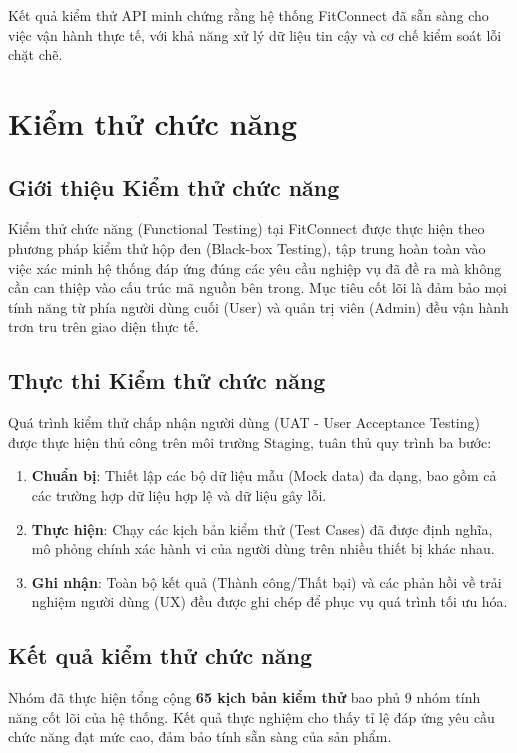 Kết quả kiểm thử API minh chứng rằng hệ thống FitConnect đã sẵn sàng cho việc vận hành thực tế, với khả năng xử lý dữ liệu tin cậy và cơ chế kiểm soát lỗi chặt chẽ.

\section{Kiểm thử chức năng}
\label{sec:test_functional}

\subsection{Giới thiệu Kiểm thử chức năng}
Kiểm thử chức năng (Functional Testing) tại FitConnect được thực hiện theo phương pháp kiểm thử hộp đen (Black-box Testing), tập trung hoàn toàn vào việc xác minh hệ thống đáp ứng đúng các yêu cầu nghiệp vụ đã đề ra mà không cần can thiệp vào cấu trúc mã nguồn bên trong. Mục tiêu cốt lõi là đảm bảo mọi tính năng từ phía người dùng cuối (User) và quản trị viên (Admin) đều vận hành trơn tru trên giao diện thực tế.

\subsection{Thực thi Kiểm thử chức năng}
Quá trình kiểm thử chấp nhận người dùng (UAT - User Acceptance Testing) được thực hiện thủ công trên môi trường Staging, tuân thủ quy trình ba bước:
\begin{enumerate}
    \item \textbf{Chuẩn bị}: Thiết lập các bộ dữ liệu mẫu (Mock data) đa dạng, bao gồm cả các trường hợp dữ liệu hợp lệ và dữ liệu gây lỗi.
    \item \textbf{Thực hiện}: Chạy các kịch bản kiểm thử (Test Cases) đã được định nghĩa, mô phỏng chính xác hành vi của người dùng trên nhiều thiết bị khác nhau.
    \item \textbf{Ghi nhận}: Toàn bộ kết quả (Thành công/Thất bại) và các phản hồi về trải nghiệm người dùng (UX) đều được ghi chép để phục vụ quá trình tối ưu hóa.
\end{enumerate}

\subsection{Kết quả kiểm thử chức năng}
Nhóm đã thực hiện tổng cộng \textbf{65 kịch bản kiểm thử} bao phủ 9 nhóm tính năng cốt lõi của hệ thống. Kết quả thực nghiệm cho thấy tỉ lệ đáp ứng yêu cầu chức năng đạt mức cao, đảm bảo tính sẵn sàng của sản phẩm.

